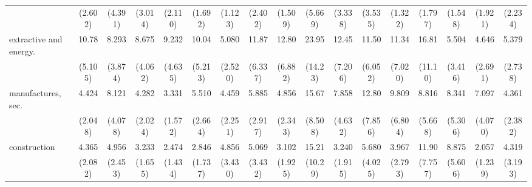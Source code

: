 {\begin{tabular}{l*{16}{c}}
                    &     (2.602)         &     (4.391)         &     (3.014)         &     (2.110)         &     (1.692)         &     (1.123)         &     (2.402)         &     (1.509)         &     (5.669)         &     (3.338)         &     (3.535)         &     (1.322)         &     (1.797)         &     (1.548)         &     (1.921)         &     (2.234)         \\
[1em]
extractive and energy.&       10.78\sym{***}&       8.293\sym{***}&       8.675\sym{***}&       9.232\sym{***}&       10.04\sym{***}&       5.080\sym{**} &       11.87\sym{***}&       12.80\sym{***}&       23.95\sym{***}&       12.45\sym{***}&       11.50\sym{***}&       11.34\sym{***}&       16.81\sym{***}&       5.504\sym{**} &       4.646\sym{**} &       5.379\sym{***}\\
                    &     (5.105)         &     (3.874)         &     (4.062)         &     (4.635)         &     (5.213)         &     (2.520)         &     (6.337)         &     (6.882)         &     (14.23)         &     (7.206)         &     (6.052)         &     (7.020)         &     (11.10)         &     (3.416)         &     (2.691)         &     (2.738)         \\
[1em]
manufactures, sec.  &       4.424\sym{**} &       8.121\sym{***}&       4.282\sym{**} &       3.331\sym{*}  &       5.510\sym{***}&       4.459\sym{**} &       5.885\sym{***}&       4.856\sym{**} &       15.67\sym{***}&       7.858\sym{***}&       12.80\sym{***}&       9.809\sym{***}&       8.816\sym{***}&       8.341\sym{***}&       7.097\sym{***}&       4.361\sym{**} \\
                    &     (2.048)         &     (4.078)         &     (2.024)         &     (1.572)         &     (2.664)         &     (2.251)         &     (2.917)         &     (2.343)         &     (8.508)         &     (4.632)         &     (7.856)         &     (6.804)         &     (5.668)         &     (5.306)         &     (4.070)         &     (2.382)         \\
[1em]
construction        &       4.365\sym{**} &       4.956\sym{**} &       3.233\sym{*}  &       2.474         &       2.846         &       4.856\sym{*}  &       5.069\sym{*}  &       3.102         &       15.21\sym{***}&       3.240\sym{*}  &       5.680\sym{*}  &       3.967         &       11.90\sym{***}&       8.875\sym{***}&       2.057         &       4.319\sym{*}  \\
                    &     (2.082)         &     (2.453)         &     (1.655)         &     (1.434)         &     (1.737)         &     (3.430)         &     (3.432)         &     (1.925)         &     (10.29)         &     (1.915)         &     (4.025)         &     (2.793)         &     (7.757)         &     (5.606)         &     (1.239)         &     (3.193)         \\

\end{tabular}}
